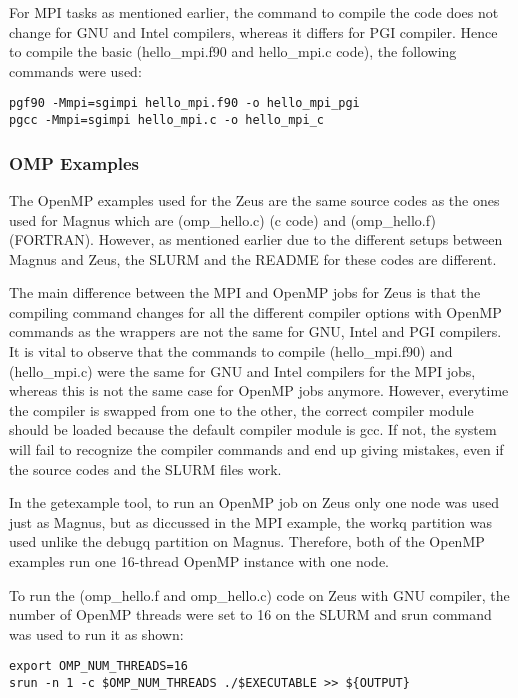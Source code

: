\documentclass[journal]{IEEEtran}
\begin{document}
For MPI tasks as mentioned earlier, the command to compile the code does not change for GNU and Intel compilers, whereas it differs for PGI compiler.
Hence to compile the basic (hello_mpi.f90 and hello_mpi.c code), the following commands were used:

\begin{verbatim}
pgf90 -Mmpi=sgimpi hello_mpi.f90 -o hello_mpi_pgi
pgcc -Mmpi=sgimpi hello_mpi.c -o hello_mpi_c 
\end{verbatim}  

\subsubsection{OMP Examples}

The OpenMP examples used for the Zeus are the same source codes as the ones used for Magnus which are (omp_hello.c) (c code) and (omp_hello.f) (FORTRAN).
However, as mentioned earlier due to the different setups between Magnus and Zeus, the SLURM and the README for these codes are different.

The main difference between the MPI and OpenMP jobs for Zeus is that the compiling command changes for all the different compiler options with OpenMP
commands as the wrappers are not the same for GNU, Intel and PGI compilers. It is vital to observe that the commands to compile (hello_mpi.f90) and
(hello_mpi.c) were the same for GNU and Intel compilers for the MPI jobs, whereas this is not the same case for OpenMP jobs anymore. However, everytime the
compiler is swapped from one to the other, the correct compiler module should be loaded because the default compiler module is gcc. If not, the system 
will fail to recognize the compiler commands and end up giving mistakes, even if the source codes and the SLURM files work.

In the getexample tool, to run an OpenMP job on Zeus only one node was used just as Magnus, but as diccussed in the MPI example, the workq partition was
used unlike the debugq partition on Magnus. Therefore, both of the OpenMP examples run one 16-thread OpenMP instance with one node.

To run the (omp_hello.f and omp_hello.c) code on Zeus with GNU compiler, the number of OpenMP threads were set to 16 on the SLURM and srun command was 
used to run it as shown:

\begin{verbatim}
export OMP_NUM_THREADS=16
srun -n 1 -c $OMP_NUM_THREADS ./$EXECUTABLE >> ${OUTPUT}
\end{verbatim}
\end{document}
